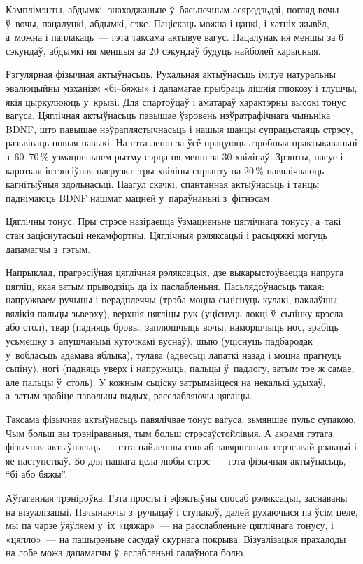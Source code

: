 Камплімэнты, абдымкі, знаходжаньне ў~бясьпечным асяродзьдзі, погляд вочы ў~вочы, пацалункі, абдымкі, сэкс. Паціскаць можна і цацкі, і хатніх жывёл, а~можна і паплакаць~--- гэта таксама актывуе вагус. Пацалунак ня меншы за 6 сэкундаў, абдымкі ня меншыя за 20 сэкундаў будуць найболей карысныя.

Рэгулярная фізычная актыўнасьць. Рухальная актыўнасьць імітуе натуральны эвалюцыйны мэханізм «бі--бяжы» і дапамагае прыбраць лішнія глюкозу і тлушчы, якія цыркулююць у~крыві. Для спартоўцаў і аматараў характэрны высокі тонус вагуса. Цяглічная актыўнасьць павышае ўзровень нэўратрафічнага чыньніка BDNF, што павышае нэўраплястычнасьць і нашыя шанцы супрацьстаяць стрэсу, разьвіваць новыя навыкі. На гэта лепш за ўсё працуюць аэробныя практыкаваньні з~60--70\,\% узмацненьнем рытму сэрца ня менш за 30 хвілінаў. Зрэшты, пасуе і кароткая інтэнсіўная нагрузка: тры хвіліны спрынту на 20\,\% павялічваюць кагнітыўныя здольнасьці. Наагул скачкі, спантанная актыўнасьць і танцы паднімаюць BDNF нашмат мацней у~параўнаньні з~фітнэсам.

Цяглічны тонус. Пры стрэсе назіраецца ўзмацненьне цяглічнага тонусу, а~такі стан заціснутасьці некамфортны. Цяглічныя рэляксацыі і расьцяжкі могуць дапамагчы з~гэтым. 

Напрыклад, прагрэсіўная цяглічная рэляксацыя, дзе выкарыстоўваецца напруга цягліц, якая затым прыводзіць да іх паслабленьня. Пасьлядоўнасьць такая: напружваем ручыцы і перадплеччы (трэба моцна сьціснуць кулакі, паклаўшы вялікія пальцы зьверху), верхнія цягліцы рук (уціснуць локці ў~сьпінку крэсла або стол), твар (падняць бровы, заплюшчыць вочы, наморшчыць нос, зрабіць усьмешку з~апушчанымі куточкамі вуснаў), шыю (уціснуць падбародак у~вобласьць адамава яблыка), тулава (адвесьці лапаткі назад і моцна прагнуць сьпіну), ногі (падняць уверх і напружыць, пальцы ў~падлогу, затым тое ж самае, але пальцы ў~столь). У кожным сьціску затрымайцеся на некалькі удыхаў, а~затым зрабіце павольны выдых, расслабляючы цягліцы.

Таксама фізычная актыўнасьць павялічвае тонус вагуса, зьмяншае пульс супакою. Чым больш вы трэніраваныя, тым больш стрэсаўстойлівыя. А акрамя гэтага, фізычная актыўнасьць~--- гэта найлепшы спосаб завяршэньня стрэсавай рэакцыі і яе наступстваў. Бо для нашага цела любы стрэс~--- гэта фізычная актыўнасьць, ``бі або бяжы''.

Аўтагенная трэніроўка. Гэта просты і эфэктыўны спосаб рэляксацыі, заснаваны на візуалізацыі. Пачынаючы з~ручыцаў і ступакоў, далей рухаючыся па ўсім целе, мы па чарзе ўяўляем у~іх «цяжар»~--- на расслабленьне цяглічнага тонусу, і «цяпло»~--- на пашырэньне сасудаў скурнага покрыва. Візуалізацыя прахалоды на лобе можа дапамагчы ў~аслабленьні галаўнога болю.

